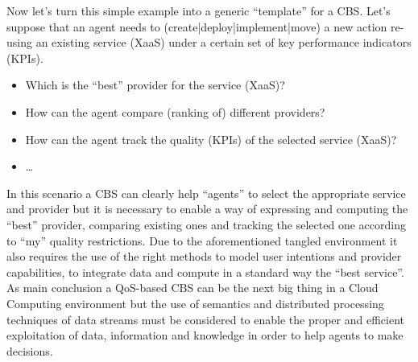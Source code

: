 Now let's turn this simple example into a generic ``template'' for a CBS. Let's suppose that an agent 
needs to (create|deploy|implement|move) a new action re-using an existing service (XaaS) 
under a certain set of key performance indicators (KPIs).
\begin{itemize}
 \item Which is the ``best'' provider for the service (XaaS)? 
 \item How can the agent compare (ranking of) different providers? 
 \item How can the agent track the quality (KPIs) of the selected service (XaaS)?
  \item \ldots
\end{itemize}

In this scenario a CBS can clearly help ``agents'' to select the appropriate service and provider 
but it is necessary to enable a way of expressing and computing the ``best'' provider, comparing 
existing ones and tracking the selected one according to ``my'' quality restrictions. Due to 
the aforementioned tangled environment it also requires the use of the right methods to model user intentions and 
provider capabilities, to integrate data and compute in a standard way the ``best service''. As main conclusion a QoS-based CBS 
can be the next big thing in a Cloud Computing environment but the use of semantics and 
distributed processing techniques of data streams must be considered to enable the proper and efficient 
exploitation of data, information and knowledge in order to help agents to make decisions.








